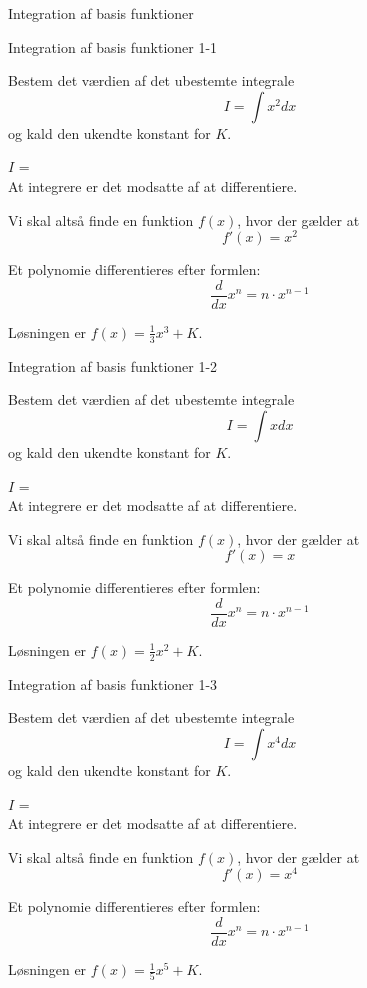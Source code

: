 \documentclass{article}
\begin{document}
Integration af basis funktioner
\tableofcontents

\begin{exercise}{Integration af basis funktioner 1-1}

Bestem det værdien af det ubestemte integrale
\[
I = \int x^2 dx
\]
og kald den ukendte konstant for $K$.

$I$ =  \\

\hint
At integrere er det modsatte af at differentiere.

\hint
Vi skal altså finde en funktion $f(x)$, hvor der gælder at
\[
f'(x) = x^2
\]

\hint
Et polynomie differentieres efter formlen:
\[
\frac{d}{dx} x^n = n \cdot x^{n - 1}
\]

\hint
Løsningen er $f(x) = \frac{1}{3} x^3 + K$.

\end{exercise}


\begin{exercise}{Integration af basis funktioner 1-2}

Bestem det værdien af det ubestemte integrale
\[
I = \int x dx
\]
og kald den ukendte konstant for $K$.

$I$ =  \\

\hint
At integrere er det modsatte af at differentiere.

\hint
Vi skal altså finde en funktion $f(x)$, hvor der gælder at
\[
f'(x) = x
\]

\hint
Et polynomie differentieres efter formlen:
\[
\frac{d}{dx} x^n = n \cdot x^{n - 1}
\]

\hint
Løsningen er $f(x) = \frac{1}{2} x^2 + K$.

\end{exercise}


\begin{exercise}{Integration af basis funktioner 1-3}

Bestem det værdien af det ubestemte integrale
\[
I = \int x^4 dx
\]
og kald den ukendte konstant for $K$.

$I$ =  \\

\hint
At integrere er det modsatte af at differentiere.

\hint
Vi skal altså finde en funktion $f(x)$, hvor der gælder at
\[
f'(x) = x^4
\]

\hint
Et polynomie differentieres efter formlen:
\[
\frac{d}{dx} x^n = n \cdot x^{n - 1}
\]

\hint
Løsningen er $f(x) = \frac{1}{5} x^5 + K$.

\end{exercise}
\end{document}
